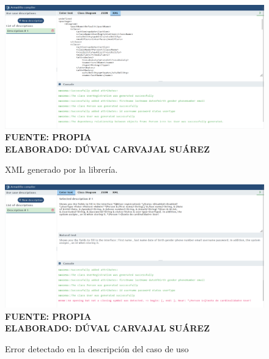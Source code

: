 \begin{figure}[H]
	\caption{XML generado por la librería.}
	\includegraphics[width=15cm]{img/anexo6.png}
	\label{fig:anexo6}
	\textbf{\\ FUENTE: PROPIA \\ ELABORADO: DÚVAL CARVAJAL SUÁREZ}
\end{figure} 

\begin{figure}[H]
	\caption{Error detectado en la descripción del caso de uso}
	\includegraphics[width=15cm]{img/anexo7.png}
	\label{fig:anexo7}
	\textbf{\\ FUENTE: PROPIA \\ ELABORADO: DÚVAL CARVAJAL SUÁREZ}
\end{figure} 